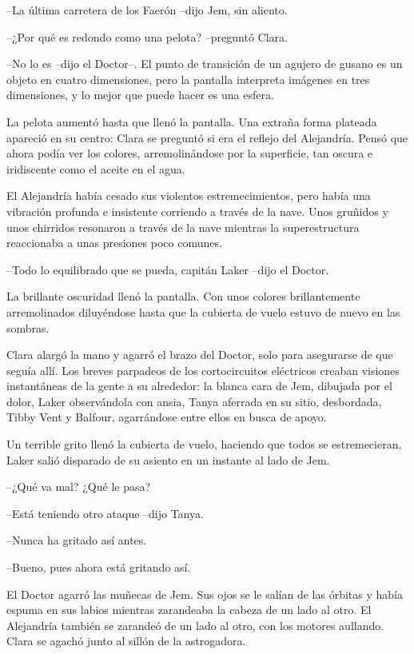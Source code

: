{--La última carretera de los Faerón --dijo Jem, sin aliento.}

{--¿Por qué es redondo como una pelota? --preguntó Clara.}

{--No lo es --dijo el Doctor--. El punto de transición de un agujero de
 gusano es un objeto en cuatro dimensiones, pero la pantalla interpreta
 imágenes en tres dimensiones, y lo mejor que puede hacer es una
esfera.}

{La pelota aumentó hasta que llenó la pantalla. Una extraña forma
 plateada apareció en su centro: Clara se preguntó si era el reflejo del
 Alejandría. Pensó que ahora podía ver los colores, arremolinándose por
la superficie, tan oscura e iridiscente como el aceite en el agua.}

{El Alejandría había cesado sus violentos estremecimientos, pero había
 una vibración profunda e insistente corriendo a través de la nave. Unos
 gruñidos y unos chirridos resonaron a través de la nave mientras la
superestructura reaccionaba a unas presiones poco comunes.}

{--Todo lo equilibrado que se pueda, capitán Laker --dijo el Doctor.}

{La brillante oscuridad llenó la pantalla. Con unos colores
 brillantemente arremolinados diluyéndose hasta que la cubierta de vuelo
estuvo de nuevo en las sombras.}

{Clara alargó la mano y agarró el brazo del Doctor, solo para asegurarse
 de que seguía allí. Los breves parpadeos de los cortocircuitos
 eléctricos creaban visiones instantáneas de la gente a su alrededor: la
 blanca cara de Jem, dibujada por el dolor, Laker observándola con ansia,
 Tanya aferrada en su sitio, desbordada, Tibby Vent y Balfour,
agarrándose entre ellos en busca de apoyo.}

{Un terrible grito llenó la cubierta de vuelo, haciendo que todos se
 estremecieran. Laker salió disparado de su asiento en un instante al
lado de Jem.}

{--¿Qué va mal? ¿Qué le pasa?}

{--Está teniendo otro ataque --dijo Tanya.}

{--Nunca ha gritado así antes.}

{--Bueno, pues ahora está gritando así.}

{El Doctor agarró las muñecas de Jem. Sus ojos se le salían de las
 órbitas y había espuma en sus labios mientras zarandeaba la cabeza de un
 lado al otro. El Alejandría también se zarandeó de un lado al otro, con
 los motores aullando. Clara se agachó junto al sillón de la
astrogadora.}

